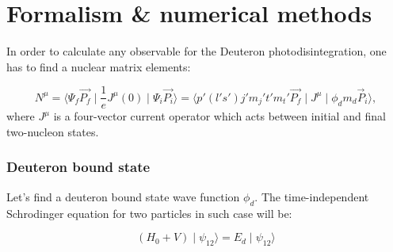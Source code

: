 
\section*{Formalism \& numerical methods}


In order to calculate any observable for the Deuteron photodisintegration,
one has to find a nuclear matrix elements:

\begin{equation}
    N^\mu = \langle \Psi_f \vec{P_f} \mid \frac{1}{e}J^\mu(0) \mid \Psi_i \vec{P_i} \rangle =
    \langle p' (l's')j'm_j't'm_t' \vec{P_f} \mid J^\mu \mid \phi_d m_d \vec{P}_i \rangle, 
\end{equation}
where $J^\mu$ is a four-vector current operator which acts between initial and final 
two-nucleon states. 



\subsubsection*{Deuteron bound state}
    
    Let's find a deuteron bound state wave function $\phi_d$. The time-independent Schrodinger
    equation for two particles in such case will be:

    \begin{equation}
        (H_0 + V) \mid \psi_{12} \rangle  = E_d \mid \psi_{12} \rangle
        \label{shrod_bound}
    \end{equation}


